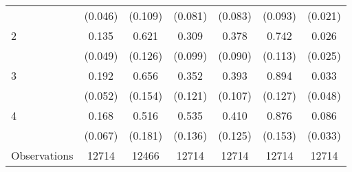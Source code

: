 {\begin{tabular}{l*{6}{c}}
                    &     (0.046)         &     (0.109)         &     (0.081)         &     (0.083)         &     (0.093)         &     (0.021)         \\
[1em]
2                   &       0.135\sym{**} &       0.621\sym{***}&       0.309\sym{**} &       0.378\sym{***}&       0.742\sym{***}&       0.026         \\
                    &     (0.049)         &     (0.126)         &     (0.099)         &     (0.090)         &     (0.113)         &     (0.025)         \\
[1em]
3                   &       0.192\sym{***}&       0.656\sym{***}&       0.352\sym{**} &       0.393\sym{***}&       0.894\sym{***}&       0.033         \\
                    &     (0.052)         &     (0.154)         &     (0.121)         &     (0.107)         &     (0.127)         &     (0.048)         \\
[1em]
4                   &       0.168\sym{*}  &       0.516\sym{**} &       0.535\sym{***}&       0.410\sym{**} &       0.876\sym{***}&       0.086\sym{**} \\
                    &     (0.067)         &     (0.181)         &     (0.136)         &     (0.125)         &     (0.153)         &     (0.033)         \\
\hline
Observations        &       12714         &       12466         &       12714         &       12714         &       12714         &       12714         \\
\hline\hline
\end{tabular}
}
